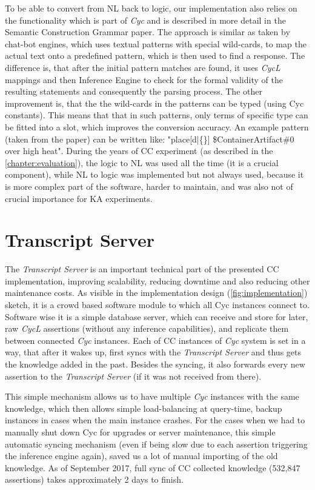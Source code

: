 To be able to convert from NL back to logic, our implementation also relies on
the functionality which is part of \emph{Cyc} and is described in more detail
in the Semantic Construction Grammar paper\parencite{Schneider2015}. The 
approach is similar as
taken by chat-bot engines\parencite{Wilcox2011}, which uses textual patterns
with special wild-cards, to map the actual text onto a predefined pattern, which
is then used to find a response. The difference is, that after the initial 
pattern matches are found, it uses \emph{CycL} mappings and then Inference 
Engine to check for
the formal validity of the resulting statements and consequently the parsing 
process. The other improvement is, that the the wild-cards in the patterns
can be typed (using Cyc constants). This means that that in such patterns, 
only terms of specific type can be fitted into a slot, which improves the 
conversion accuracy. An example pattern (taken from the paper) can be written 
like: "place[d|\{\}] \$ContainerArtifact\#0 over high heat".
During the years of CC experiment (as described in the 
\autoref{chapter:evaluation}), the logic to NL was used all the time (it is a
crucial component), while NL to logic was implemented but not always used, 
because it is more complex part of the software, harder to maintain, and was
also not of crucial importance for KA experiments.

\section{Transcript Server}
\label{section:transcriptserver}
The \emph{Transcript Server} is an important technical part of the presented CC 
implementation, improving scalability, reducing downtime and also reducing
other maintenance costs. As visible in the implementation design 
(\autoref{fig:implementation}) sketch, it is a crowd based software module
to which all Cyc instances connect to. Software wise it is a simple database
server, which can receive and store for later, raw \emph{CycL} assertions 
(without any inference capabilities), and replicate them between 
connected \emph{Cyc} instances. Each of CC instances of \emph{Cyc} system is
set in a way, that after it wakes up, first syncs with the \emph{Transcript 
Server} and thus gets the knowledge added in the past. Besides the syncing,
it also forwards every new assertion to the \emph{Transcript Server} (if it was
not received from there). 

This simple mechanism allows us to have multiple \emph{Cyc} instances with
the same knowledge, which then allows simple load-balancing at query-time,
backup instances in cases when the main instance crashes. For the cases when
we had to manually shut down Cyc for upgrades or server maintenance, this simple
automatic syncing mechanism (even if being slow due to each assertion triggering
the inference engine again), saved us a lot of manual importing of the old knowledge.
 As of September 2017, full sync of CC collected knowledge (532,847 
assertions) takes approximately 2 days to finish.


